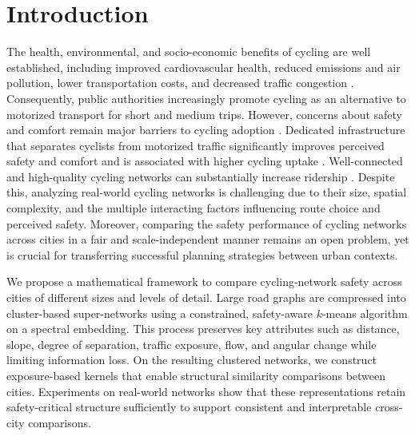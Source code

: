 \documentclass[lettersize,journal]{IEEEtran}
\begin{document}


\section{Introduction}
\label{introduction}

The health, environmental, and socio-economic benefits of cycling are well established, including improved cardiovascular health, reduced emissions and air pollution, lower transportation costs, and decreased traffic congestion \cite{garrard2012health, gotschi2016cycling}. Consequently, public authorities increasingly promote cycling as an alternative to motorized transport for short and medium trips. However, concerns about safety and comfort remain major barriers to cycling adoption \cite{fishman2012barriers}. Dedicated infrastructure that separates cyclists from motorized traffic significantly improves perceived safety and comfort and is associated with higher cycling uptake \cite{lawrence2018cyclist, broach2012cyclists}. Well-connected and high-quality cycling networks can substantially increase ridership \cite{pucher2011walking, pucher2017cycling}. Despite this, analyzing real-world cycling networks is challenging due to their size, spatial complexity, and the multiple interacting factors influencing route choice and perceived safety. Moreover, comparing the safety performance of cycling networks across cities in a fair and scale-independent manner remains an open problem, yet is crucial for transferring successful planning strategies between urban contexts.

We propose a mathematical framework to compare cycling-network safety across cities of different sizes and levels of detail. Large road graphs are compressed into cluster-based super-networks using a constrained, safety-aware $k$-means algorithm on a spectral embedding. This process preserves key attributes such as distance, slope, degree of separation, traffic exposure, flow, and angular change while limiting information loss. On the resulting clustered networks, we construct exposure-based kernels that enable structural similarity comparisons between cities. Experiments on real-world networks show that these representations retain safety-critical structure sufficiently to support consistent and interpretable cross-city comparisons.
\end{document}
